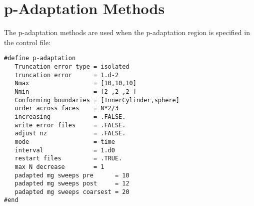 \documentclass[a4paper,10pt]{report}
\begin{document}
\chapter{p-Adaptation Methods}
The p-adaptation methods are used when the p-adaptation region is specified in the control file:\\

\begin{lstlisting}
#define p-adaptation
   Truncation error type = isolated
   truncation error      = 1.d-2
   Nmax                  = [10,10,10]
   Nmin                  = [2 ,2 ,2 ]
   Conforming boundaries = [InnerCylinder,sphere]
   order across faces    = N*2/3
   increasing            = .FALSE.
   write error files     = .FALSE.
   adjust nz             = .FALSE.
   mode                  = time
   interval              = 1.d0
   restart files         = .TRUE.
   max N decrease        = 1
   padapted mg sweeps pre      = 10
   padapted mg sweeps post     = 12
   padapted mg sweeps coarsest = 20
#end
\end{lstlisting}
\end{document}
